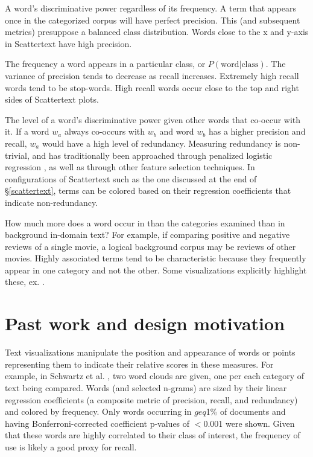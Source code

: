 \documentclass[11pt,a4paper]{article}
\begin{document}
\begin{description}[style=unboxed,leftmargin=0cm]
\item[Precision] A word's discriminative power regardless of its frequency.  A term that appears once in the categorized corpus will have perfect precision. This (and subsequent metrics) presuppose a balanced class distribution.  Words close to the x and y-axis in Scattertext have high precision.  \vspace{-0.1in}
\item[Recall] The frequency a word appears in a particular class, or $P(\mbox{word}|\mbox{class})$.  The variance of precision tends to decrease as recall increases.  Extremely high recall words tend to be stop-words.  High recall words occur close to the top and right sides of Scattertext plots.  \vspace{-0.1in}
\item[Non-redundancy] The level of a word's discriminative power given other words that co-occur with it.  If a word $w_a$ always co-occurs with $w_b$ and word $w_b$ has a higher precision and recall, $w_a$ would have a high level of redundancy. Measuring redundancy is non-trivial, and has traditionally been approached through penalized logistic regression \cite{joshi2010}, as well as through other feature selection techniques.  In configurations of Scattertext such as the one discussed at the end of \S\ref{scattertext}, terms can be colored based on their regression coefficients that indicate non-redundancy.  \vspace{-0.1in}
\item[Characteristicness] How much more does a word occur in than the categories examined than in background in-domain text?  For example, if comparing positive and negative reviews of a single movie, a logical background corpus may be reviews of other movies. Highly associated terms tend to be characteristic because they frequently appear in one category and not the other. Some visualizations explicitly highlight these, ex. \cite{vennclouds}. \vspace{-0.1in}
\end{description}
\section{Past work and design motivation}
\label{pastwork}
Text visualizations manipulate the position and appearance of words or points representing them to indicate their relative scores in these measures. For example, in Schwartz et al. , two word clouds are given, one per each category of text being compared.  Words (and selected n-grams) are sized by their linear regression coefficients (a composite metric of precision, recall, and redundancy) and colored by frequency. Only words occurring in $geq$1\% of documents and having Bonferroni-corrected coefficient p-values of $<$0.001 were shown. Given that these words are highly correlated to their class of interest, the frequency of use is likely a good proxy for recall.
\end{document}
